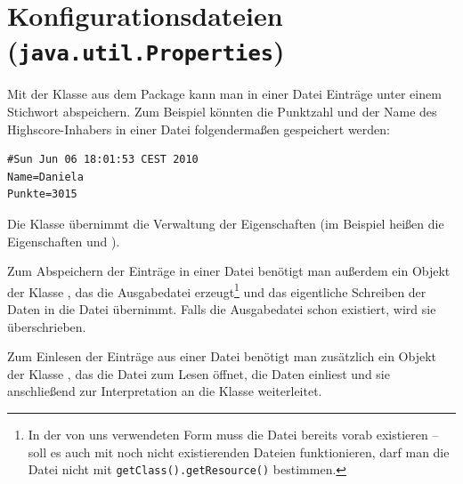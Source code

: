 \clearpage

\rehead[]{\textcolor{lightblue}{AvHG, Inf, My}}
\lohead[]{\textcolor{lightblue}{AvHG, Inf, My}}


\section{Konfigurationsdateien (\texttt{java.util.Properties})}

Mit der Klasse  aus dem Package  kann
man in einer Datei Einträge unter einem Stichwort abspeichern. Zum Beispiel
könnten die Punktzahl und der Name des Highscore-Inhabers in einer Datei
folgendermaßen gespeichert werden:

\begin{lstlisting}
#Sun Jun 06 18:01:53 CEST 2010
Name=Daniela
Punkte=3015
\end{lstlisting}

Die Klasse  übernimmt die Verwaltung der Eigenschaften (im
Beispiel heißen die Eigenschaften  und ).

Zum Abspeichern der Einträge in einer Datei benötigt man außerdem ein
Objekt der Klasse , das die Ausgabedatei
erzeugt\footnote{In der von uns verwendeten Form muss die Datei bereits vorab
existieren -- soll es auch mit noch nicht existierenden Dateien funktionieren,
darf man die Datei nicht mit \texttt{getClass().getResource()} bestimmen.}
und das eigentliche Schreiben der Daten in die Datei übernimmt. Falls die
Ausgabedatei schon existiert, wird sie überschrieben.

Zum Einlesen der Einträge aus einer Datei benötigt man zusätzlich ein Objekt
der Klasse , das die Datei zum Lesen öffnet, die
Daten einliest und sie anschließend zur Interpretation an die Klasse
 weiterleitet.

